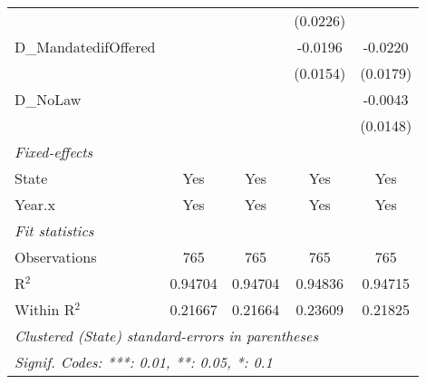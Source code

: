 \begin{tabular}{lcccc}
                                  &                         &                         & (0.0226)                &   \\   
   D\_MandatedifOffered           &                         &                         & -0.0196                 & -0.0220\\   
                                  &                         &                         & (0.0154)                & (0.0179)\\   
   D\_NoLaw                       &                         &                         &                         & -0.0043\\   
                                  &                         &                         &                         & (0.0148)\\   
   \midrule
   \emph{Fixed-effects}\\
   State                          & Yes                     & Yes                     & Yes                     & Yes\\  
   Year.x                         & Yes                     & Yes                     & Yes                     & Yes\\  
   \midrule
   \emph{Fit statistics}\\
   Observations                   & 765                     & 765                     & 765                     & 765\\  
   R$^2$                          & 0.94704                 & 0.94704                 & 0.94836                 & 0.94715\\  
   Within R$^2$                   & 0.21667                 & 0.21664                 & 0.23609                 & 0.21825\\  
   \midrule \midrule
   \multicolumn{5}{l}{\emph{Clustered (State) standard-errors in parentheses}}\\
   \multicolumn{5}{l}{\emph{Signif. Codes: ***: 0.01, **: 0.05, *: 0.1}}\\
\end{tabular}
\par\endgroup



